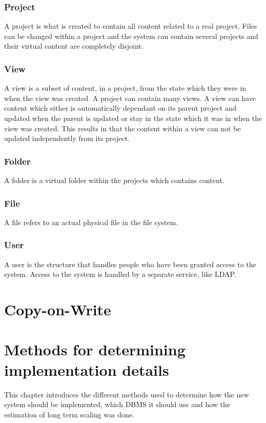 \documentclass[a4paper,12pt]{article}
\begin{document}
\subsubsection{Project}
A project is what is created to contain all content related to a real project. Files can be changed within a project and 
the system can contain several projects and their virtual content are completely disjoint.

\subsubsection{View}
A view is a subset of content, in a project, from the state which they were in when the view was created. A project can 
contain many views. A view can have content which either is automatically dependant on its parent project and updated 
when the parent is updated or stay in the state which it was in when the view was created. This results in that the content 
within a view can not be updated independently from its project.

\subsubsection{Folder}
A folder is a virtual folder within the projects which contains content.

\subsubsection{File}
A file refers to an actual physical file in the file system.

\subsubsection{User}
A user is the structure that handles people who have been granted access to the system.
Access to the system is handled by a separate service, like LDAP.

\newpage 
\section{Copy-on-Write}

\section{Methods for determining\\implementation details}
This chapter introduces the different methods used to determine how the new system should be implemented, 
which DBMS it should use and how the estimation of long term scaling was done.
\end{document}
